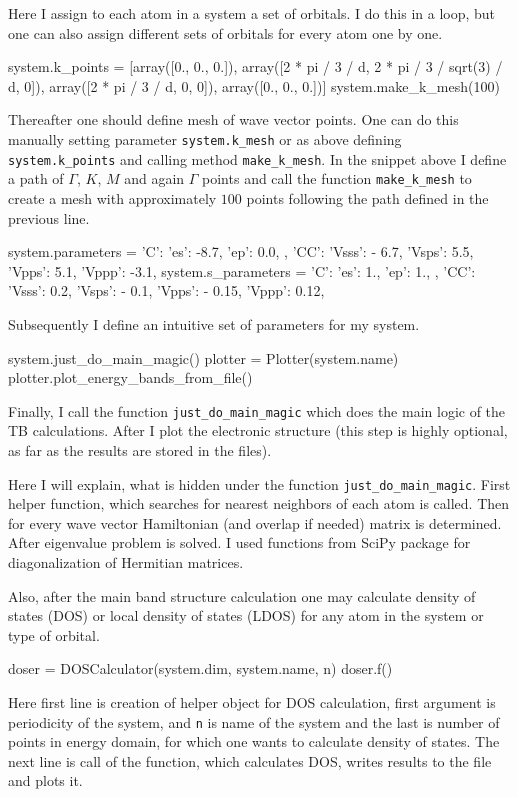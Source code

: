 Here I assign to each atom in a system a set of orbitals. I do this in a loop, but one can also assign different sets of orbitals for every atom one by one.

\begin{python}
system.k_points = [array([0., 0., 0.]),
                   array([2 * pi / 3 / d, 2 * pi / 3 / sqrt(3) / d, 0]),
                   array([2 * pi / 3 / d, 0, 0]),
                   array([0., 0., 0.])]
system.make_k_mesh(100)
\end{python}

Thereafter one should define mesh of wave vector points. One can do this manually setting parameter \verb!system.k_mesh! or as above defining \verb!system.k_points! and calling method \verb!make_k_mesh!. In the snippet above I define a path of $\Gamma$, $K$, $M$ and again $\Gamma$ points and call the function \verb!make_k_mesh! to create a mesh with approximately $100$ points following the path defined in the previous line.

\begin{python}
system.parameters = {
    'C': {
        'es': -8.7,
        'ep': 0.0,
    },
    'CC': {
        'Vsss': - 6.7,
        'Vsps': 5.5,
        'Vpps': 5.1,
        'Vppp': -3.1,
    }
}
system.s_parameters = {
    'C': {
        'es': 1.,
        'ep': 1.,
    },
    'CC': {
        'Vsss': 0.2,
        'Vsps': - 0.1,
        'Vpps': - 0.15,
        'Vppp': 0.12,
    }
}
\end{python}

Subsequently I define an intuitive set of parameters for my system.

\begin{python}
system.just_do_main_magic()
plotter = Plotter(system.name)
plotter.plot_energy_bands_from_file()
\end{python}

Finally, I call the function \verb!just_do_main_magic! which does the main logic of the TB calculations. After I plot the electronic structure (this step is highly optional, as far as the results are stored in the files).

Here I will explain, what is hidden under the function \verb!just_do_main_magic!. First helper function, which searches for nearest neighbors of each atom is called. Then for every wave vector Hamiltonian (and overlap if needed) matrix is determined. After eigenvalue problem is solved. I used functions from SciPy package for diagonalization of Hermitian matrices.

Also, after the main band structure calculation one may calculate density of states (DOS) or local density of states (LDOS) for any atom in the system or type of orbital.
\begin{python}
doser = DOSCalculator(system.dim, system.name, n)
doser.f()
\end{python}
Here first line is creation of helper object for DOS calculation, first argument is periodicity of the system, and \verb!n! is name of the system and the last is number of points in energy domain, for which one wants to calculate density of states. The next line is call of the function, which calculates DOS, writes results to the file and plots it.

